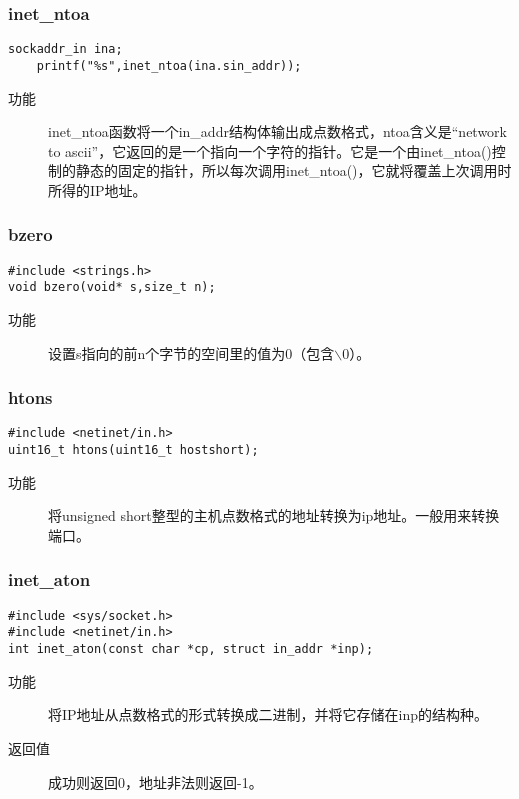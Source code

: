\subsubsection{inet\_{}ntoa}
\begin{lstlisting}[style=C]
	sockaddr_in ina;
	printf("%s",inet_ntoa(ina.sin_addr));
\end{lstlisting}
\begin{description}
\item[功能]	inet\_ntoa函数将一个in\_{}addr结构体输出成点数格式，ntoa含义是“network to ascii”，它返回的是一个指向一个字符的指针。它是一个由inet\_{}ntoa()控制的静态的固定的指针，所以每次调用inet\_{}ntoa()，它就将覆盖上次调用时所得的IP地址。
\end{description}


\subsubsection{bzero}
\begin{lstlisting}[style=C]
#include <strings.h>
void bzero(void* s,size_t n);
\end{lstlisting}
\begin{description}
\item[功能]	设置s指向的前n个字节的空间里的值为0（包含$\backslash{}0$）。
\end{description}


\subsubsection{htons}
\begin{lstlisting}[style=C]
#include <netinet/in.h>
uint16_t htons(uint16_t hostshort);
\end{lstlisting}
\begin{description}
\item[功能]	将unsigned short整型的主机点数格式的地址转换为ip地址。一般用来转换端口。
\end{description}


\subsubsection{inet\_{}aton}
\begin{lstlisting}[style=C]
#include <sys/socket.h>
#include <netinet/in.h>
int inet_aton(const char *cp, struct in_addr *inp);
\end{lstlisting}
\begin{description}
\item[功能]	将IP地址从点数格式的形式转换成二进制，并将它存储在inp的结构种。
\item[返回值]		成功则返回0，地址非法则返回-1。
\end{description}








